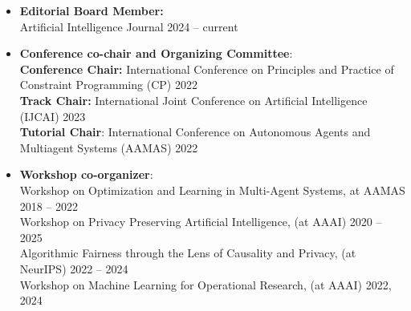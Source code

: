 \documentclass[localFont,alternative]{documentMETADATA}
\begin{document}

\vspace{6pt}
\vspace{6pt}
  \begin{itemize}
  	\item {\bf Editorial Board Member:}\\
  	Artificial Intelligence Journal \hfill{2024 -- current}
    \item {\bf Conference co-chair and Organizing Committee}:  \\
    {\bf Conference Chair:} International Conference on Principles and Practice of Constraint Programming (CP)  \hfill{2022}\\
    {\bf Track Chair:} International Joint Conference on Artificial Intelligence (IJCAI) \hfill{2023}\\
		{\bf Tutorial Chair}:  International Conference on Autonomous Agents and Multiagent Systems (AAMAS) \hfill{2022}
		
    \item {\bf Workshop co-organizer}: \\
    {Workshop on Optimization and Learning in Multi-Agent Systems, at AAMAS} \hfill{2018 -- 2022}\\
    {Workshop on Privacy Preserving Artificial Intelligence, (at AAAI)}   \hfill{2020 -- 2025}\\
    {Algorithmic Fairness through the Lens of Causality and Privacy, (at NeurIPS)} \hfill{2022 -- 2024}\\
    {Workshop on Machine Learning for Operational Research, (at AAAI)}   \hfill{2022, 2024}
    

\end{itemize}
\end{document}

